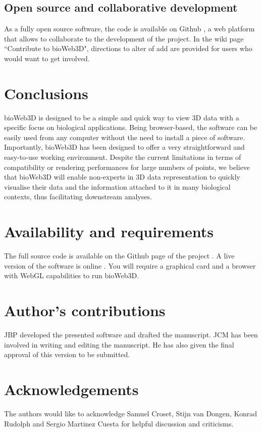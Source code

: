 \documentclass[10pt]{bmc_article}
\newenvironment{bmcformat}{\baselineskip20pt\sloppy\setboolean{publ}{false}}{\baselineskip20pt\sloppy}
\begin{document}
\begin{bmcformat}
	\subsection{Open source and collaborative development}
As a fully open source software, the code is available on Github \cite{github}, a web platform that allows to collaborate to the development of the project. In the wiki page ``Contribute to bioWeb3D", directions to alter of add are provided for users who would want to get involved.

\section{Conclusions}
bioWeb3D is designed to be a simple and quick way to view 3D data with a specific focus on biological applications.  Being browser-based, the software can be easily used from any computer without the need to install a piece of software. Importantly, bioWeb3D has been designed to offer a very straightforward and easy-to-use working environment. Despite the current limitations in terms of compatibility or rendering performances for large numbers of points, we believe that bioWeb3D will enable non-experts in 3D data representation to quickly visualise their data and the information attached to it in many biological contexts, thus facilitating downstream analyses.

\section{Availability and requirements}
The full source code is available on the Github page of the project \cite{github}. A live version of the software is online \cite{bioWeb3D}. You will require a graphical card and a browser with WebGL capabilities to run bioWeb3D.




\bigskip

\section*{Author's contributions}
JBP developed the presented software and drafted the manuscript. JCM has been involved in writing and editing the manuscript. He has also given the final approval of this version to be submitted.

    

\section*{Acknowledgements}
The authors would like to acknowledge Samuel Croset, Stijn van Dongen, Konrad Rudolph and Sergio Martinez Cuesta for helpful discussion and criticisms.
 

\end{bmcformat}
\end{document}
